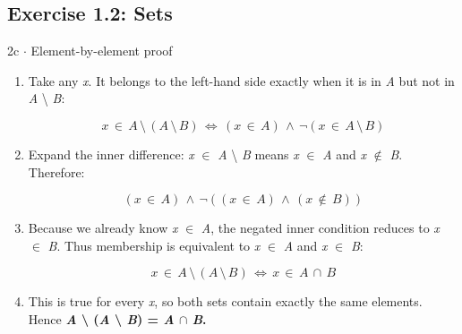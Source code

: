 \documentclass[11pt]{article}
\begin{document}
\begin{keepsection}\subsection{Exercise 1.2: Sets}

\begin{workedbox}{2c \ensuremath{\cdot} Element-by-element proof}
\begin{enumerate}
\item {}
Take any \textit{x}. It belongs to the left-hand side exactly when it is in \textit{A} but not in \textit{A} \textbackslash{} \textit{B}:

\begin{equation*}{x}\, \in \, {A}\, \setminus \, ({A}\, \setminus \, {B})\, \Leftrightarrow \, ({x}\, \in \, {A})\, \land \, \neg ({x}\, \in \, {A}\, \setminus \, {B})\end{equation*}
\item {}
Expand the inner difference: \textit{x} \ensuremath{\in} \textit{A} \textbackslash{} \textit{B} means \textit{x} \ensuremath{\in} \textit{A} and \textit{x} \ensuremath{\notin} \textit{B}. Therefore:

\begin{equation*}({x}\, \in \, {A})\, \land \, \neg (({x}\, \in \, {A})\, \land \, ({x}\, \notin \, {B}))\end{equation*}
\item {}
Because we already know \textit{x} \ensuremath{\in} \textit{A}, the negated inner condition reduces to \textit{x} \ensuremath{\in} \textit{B}. Thus membership is equivalent to \textit{x} \ensuremath{\in} \textit{A} and \textit{x} \ensuremath{\in} \textit{B}:

\begin{equation*}{x}\, \in \, {A}\, \setminus \, ({A}\, \setminus \, {B})\, \Leftrightarrow \, {x}\, \in \, {A}\, \cap \, {B}\end{equation*}
\item This is true for every \textit{x}, so both sets contain exactly the same elements. Hence \textbf{\textit{A} \textbackslash{} (\textit{A} \textbackslash{} \textit{B}) = \textit{A} \ensuremath{\cap} \textit{B}.}
\end{enumerate}
\end{workedbox}

\end{keepsection}
\end{document}
